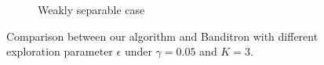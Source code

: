 \begin{figure}
\begin{subfigure}[b]{0.23\textwidth}
        \caption{Weakly separable case}
    \end{subfigure}
    \vspace*{-0.2cm}
    \caption{Comparison between our algorithm and Banditron with different exploration parameter $\epsilon$ under $\gamma=0.05$ and $K=3$.}
    \label{fig:both}
\end{figure}

